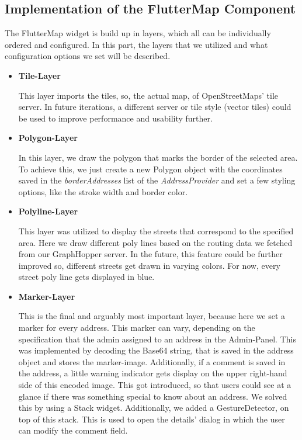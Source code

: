 \subsection{Implementation of the FlutterMap Component}

The FlutterMap widget is build up in layers, which all can be individually ordered and configured. In this part, the layers that we utilized and what configuration options we set will be described. 

\begin{itemize}
  \item \textbf{Tile-Layer}
  
  This layer imports the tiles, so, the actual map, of OpenStreetMaps' tile server. In future iterations, a different server or tile style (vector tiles) could be used to improve performance and usability further.

  \item \textbf{Polygon-Layer}
  
  In this layer, we draw the polygon that marks the border of the selected area. To achieve this, we just create a new Polygon object with the coordinates saved in the \textit{borderAddresses} list of the \textit{AddressProvider} and set a few styling options, like the stroke width and border color.

  \item \textbf{Polyline-Layer}
  
  This layer was utilized to display the streets that correspond to the specified area. Here we draw different poly lines based on the routing data we fetched from our GraphHopper server. In the future, this feature could be further improved so, different streets get drawn in varying colors. For now, every street poly line gets displayed in blue. 

  \item \textbf{Marker-Layer}
  
  This is the final and arguably most important layer, because here we set a marker for every address. This marker can vary, depending on the specification that the admin assigned to an address in the Admin-Panel. This was implemented by decoding the Base64 string, that is saved in the address object and stores the marker-image. Additionally, if a comment is saved in the address, a little warning indicator gets display on the upper right-hand side of this encoded image. This got introduced, so that users could see at a glance if there was something special to know about an address. We solved this by using a Stack widget. Additionally, we added a GestureDetector, on top of this stack. This is used to open the details' dialog in which the user can modify the comment field. 
\end{itemize}

\newpage
